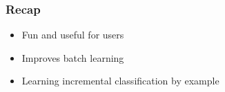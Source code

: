 \begin{frame}

	\frametitle{Recap}

	\begin{itemize}
			\item Fun and useful for users
			\item Improves batch learning
			\item Learning incremental classification by example
	\end{itemize}
\end{frame}
